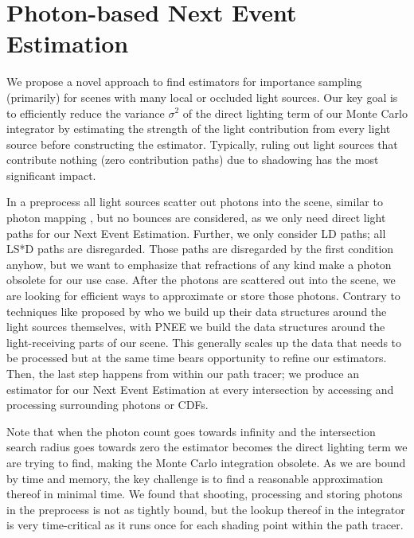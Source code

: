 
\chapter{Photon-based Next Event Estimation}
\label{ch:PNEE}

We propose a novel approach to find estimators for importance sampling (primarily) for scenes with many local or occluded light sources. Our key goal is to efficiently reduce the variance $\sigma^2$ of the direct lighting term of our Monte Carlo integrator by estimating the strength of the light contribution from every light source before constructing the estimator. Typically, ruling out light sources that contribute nothing (zero contribution paths) due to shadowing has the most significant impact.

In a preprocess all light sources scatter out photons into the scene, similar to photon mapping \parencite{jensen2001realistic}, but no bounces are considered, as we only need direct light paths for our Next Event Estimation. Further, we only consider LD paths; all LS*D paths are disregarded. Those paths are disregarded by the first condition anyhow, but we want to emphasize that refractions of any kind make a photon obsolete for our use case. After the photons are scattered out into the scene, we are looking for efficient ways to approximate or store those photons. Contrary to techniques like proposed by \textcite{Estevez} who we build up their data structures around the light sources themselves, with PNEE we build the data structures around the light-receiving parts of our scene. This generally scales up the data that needs to be processed but at the same time bears opportunity to refine our estimators. Then, the last step happens from within our path tracer; we produce an estimator for our Next Event Estimation at every intersection by accessing and processing surrounding photons or CDFs.

Note that when the photon count goes towards infinity and the intersection search radius goes towards zero the estimator becomes the direct lighting term we are trying to find, making the Monte Carlo integration obsolete. As we are bound by time and memory, the key challenge is to find a reasonable approximation thereof in minimal time. We found that shooting, processing and storing photons in the preprocess is not as tightly bound, but the lookup thereof in the integrator is very time-critical as it runs once for each shading point within the path tracer.



